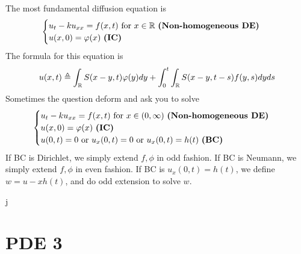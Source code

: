 \documentclass{report}
\begin{document}
\begin{mdframed}
The most fundamental diffusion equation is 
\begin{align*}
\begin{cases}
  u_t-ku_{xx}=f(x,t)\text{ for }x\inr\text{ \textbf{(Non-homogeneous DE)} }\\
 u(x,0)=\phi (x)\text{ \textbf{(IC)} } 
\end{cases}
\end{align*}
The formula for this equation is 
\begin{align*}
u(x,t)\triangleq \int_{\R}S(x-y,t) \phi (y)dy+ \int_0^t \int_{\R}S(x-y,t-s)f(y,s)dyds
\end{align*}
Sometimes the question deform and ask you to solve 
\begin{align*}
\begin{cases}
  u_t-ku_{xx}=f(x,t)\text{ for }x\in (0,\infty)\text{ \textbf{(Non-homogeneous DE)} }\\
 u(x,0)=\phi (x)\text{ \textbf{(IC)} } \\
 u(0,t)=0\text{ or }u_x(0,t)=0\text{ or }u_x(0,t)=h(t)\text{ \textbf{(BC)} }
\end{cases}
\end{align*}
If BC is Dirichlet, we simply extend $f,\phi$ in odd fashion. If BC is Neumann, we simply extend $f,\phi$ in even fashion. If BC is  $u_x(0,t)=h(t)$, we define $w=u-xh(t)$, and do odd extension to solve $w$. 
\end{mdframed}
\begin{mdframed}
j
\end{mdframed}
\chapter{PDE 3}
\end{document}
